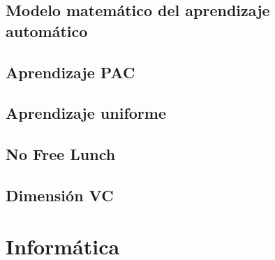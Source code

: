 \documentclass[a4paper,11pt]{report}
\begin{document}
  \chapter{Modelo matemático del aprendizaje automático}
    
  \chapter{Aprendizaje PAC}
    
  \chapter{Aprendizaje uniforme}
    
  \chapter{No Free Lunch}
    
  \chapter{Dimensión VC}
    
  
\part{Informática}



\end{document}
